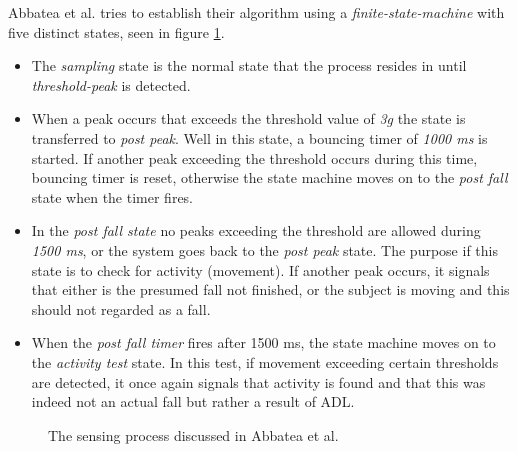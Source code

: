 \documentclass[12pt, a4paper, onecolumn]{article}
\begin{document}
	Abbatea et al. tries to establish their algorithm using a \textit{finite-state-machine} with five distinct states, seen in figure \ref{fig:abbatea-state-machine}.
	
	\begin{itemize}
		\item The \textit{sampling} state is the normal state that the process resides in until \textit{threshold-peak} is detected.
		
		\item When a peak occurs that exceeds the threshold value of \textit{3g} the state is transferred to \textit{post peak}. Well in this state, a bouncing timer of \textit{1000 ms} is started. If another peak exceeding the threshold occurs during this time, bouncing timer is reset, otherwise the state machine moves on to the \textit{post fall} state when the timer fires.
		
		\item In the \textit{post fall state} no peaks exceeding the threshold are allowed during \textit{1500 ms}, or the system goes back to the \textit{post peak} state. The purpose if this state is to check for activity (movement). If another peak occurs, it signals that either is the presumed fall not finished, or the subject is moving and this should not regarded as a fall. 
		
		\item When the \textit{post fall timer} fires after 1500 ms, the state machine moves on to the \textit{activity test} state. In this test, if movement exceeding certain thresholds are detected, it once again signals that activity is found and that this was indeed not an actual fall but rather a result of ADL. 
		
	\end{itemize}  
	
	
	\begin{figure}[H]
		\centering
		\caption{The sensing process discussed in Abbatea et al.}%
		\label{fig:abbatea-state-machine}%
	\end{figure}
	
\end{document}
